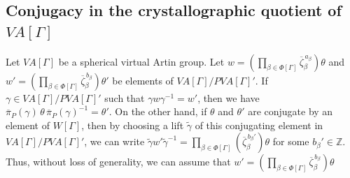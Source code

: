 \documentclass[12pt]{amsart}
\numberwithin{equation}{section}
\begin{document}
\subsection{Conjugacy in the crystallographic quotient of $VA[\Gamma]$} 
Let $VA[\Gamma]$ be a spherical virtual Artin group. Let $w=(\prod_{\beta \in \Phi[\Gamma]} \overline{\zeta}_{\beta}^{\,a_\beta})\theta$ and  $w'=(\prod_{\beta \in \Phi[\Gamma]} \overline{\zeta}_{\beta}^{\, b_\beta})\theta'$ be elements of $ VA[\Gamma]/PVA[\Gamma]'$. If $\gamma\in VA[\Gamma]/PVA[\Gamma]'$ such that $\gamma w \gamma^{-1}=w'$, then we have $\overline{\pi}_P(\gamma)\, \theta \, \overline{\pi}_P(\gamma)^{-1}=\theta'$. On the other hand, if  $\theta$ and $\theta'$ are conjugate by an element of $W[\Gamma]$, then by choosing a lift  $\tilde{\gamma}$ of this conjugating element in $ VA[\Gamma]/PVA[\Gamma]'$, we can write $\tilde{\gamma} w'\tilde{\gamma}^{-1}=\prod_{\beta \in \Phi[\Gamma]} (\overline{\zeta}_{\beta}^{\,b_\beta'})\theta$ for some $b_\beta' \in \mathbb{Z}$. Thus, without loss of generality, we can assume that $w'=(\prod_{\beta \in \Phi[\Gamma]} \overline{\zeta}_{\beta}^{\,b_\beta})\theta$ 
\end{document}
